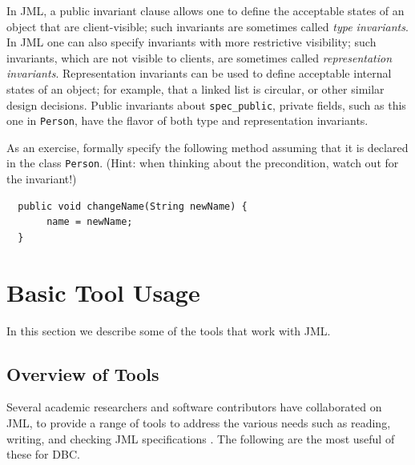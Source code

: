 \documentclass[twocolumn]{article}
\begin{document}
In JML, a public invariant clause allows one to define the acceptable
states of an object that are client-visible;
such invariants are sometimes called \emph{type invariants}.
In JML one can also specify invariants with more restrictive
visibility;
such invariants, which are not visible to clients,
are sometimes called \emph{representation invariants}.
Representation invariants can be used to define acceptable internal
states of an object; for example, that a linked list is circular, or
other similar design decisions.
Public invariants about \texttt{spec\_public}, private fields, such as
this one in \texttt{Person}, have the flavor of both type and
representation invariants. 

As an exercise, formally specify the following method assuming that it
is declared in the class \texttt{Person}.
(Hint: when thinking about the precondition, watch out for the invariant!)

\begin{verbatim}
  public void changeName(String newName) {
       name = newName;
  }
\end{verbatim}

\section{Basic Tool Usage}
\label{sect-tools}

In this section we describe some of the tools that work with JML.

\subsection{Overview of Tools}

Several academic researchers and software contributors have
collaborated on JML, to provide
a range of tools to address the various needs such as
reading, writing, and checking JML specifications \cite{Burdy-etal05}.
The following are the most useful of these for DBC.
\end{document}
